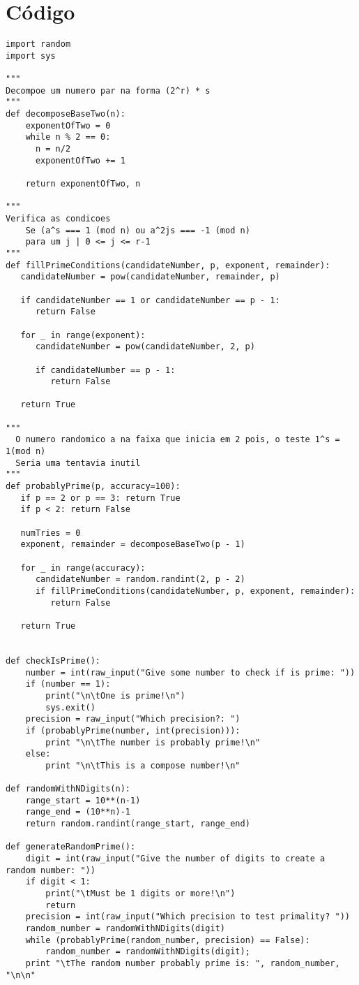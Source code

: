 \documentclass[a4paper,11pt]{article}
\theoremstyle{mytheor}
\begin{document}
\section*{Código}

\begin{lstlisting}[label={list:first},caption=Miller Rabin prime test em Python.]
import random
import sys

"""
Decompoe um numero par na forma (2^r) * s
"""
def decomposeBaseTwo(n):
    exponentOfTwo = 0
    while n % 2 == 0:
      n = n/2
      exponentOfTwo += 1
 
    return exponentOfTwo, n

"""
Verifica as condicoes
    Se (a^s === 1 (mod n) ou a^2js === -1 (mod n) 
    para um j | 0 <= j <= r-1
"""
def fillPrimeConditions(candidateNumber, p, exponent, remainder):
   candidateNumber = pow(candidateNumber, remainder, p)
 
   if candidateNumber == 1 or candidateNumber == p - 1:
      return False
 
   for _ in range(exponent):
      candidateNumber = pow(candidateNumber, 2, p)
 
      if candidateNumber == p - 1:
         return False
 
   return True
 
"""
  O numero randomico a na faixa que inicia em 2 pois, o teste 1^s = 1(mod n)
  Seria uma tentavia inutil
"""
def probablyPrime(p, accuracy=100):
   if p == 2 or p == 3: return True
   if p < 2: return False
 
   numTries = 0
   exponent, remainder = decomposeBaseTwo(p - 1)
 
   for _ in range(accuracy):
      candidateNumber = random.randint(2, p - 2)
      if fillPrimeConditions(candidateNumber, p, exponent, remainder):
         return False
 
   return True


def checkIsPrime():
    number = int(raw_input("Give some number to check if is prime: "))
    if (number == 1):
        print("\n\tOne is prime!\n")
        sys.exit()
    precision = raw_input("Which precision?: ")
    if (probablyPrime(number, int(precision))):
        print "\n\tThe number is probably prime!\n"
    else:
        print "\n\tThis is a compose number!\n"

def randomWithNDigits(n):
    range_start = 10**(n-1)
    range_end = (10**n)-1
    return random.randint(range_start, range_end)

def generateRandomPrime():
    digit = int(raw_input("Give the number of digits to create a random number: "))
    if digit < 1:
        print("\tMust be 1 digits or more!\n")
        return
    precision = int(raw_input("Which precision to test primality? "))
    random_number = randomWithNDigits(digit)
    while (probablyPrime(random_number, precision) == False):
        random_number = randomWithNDigits(digit);
    print "\tThe random number probably prime is: ", random_number, "\n\n"


\end{lstlisting}
\end{document}
